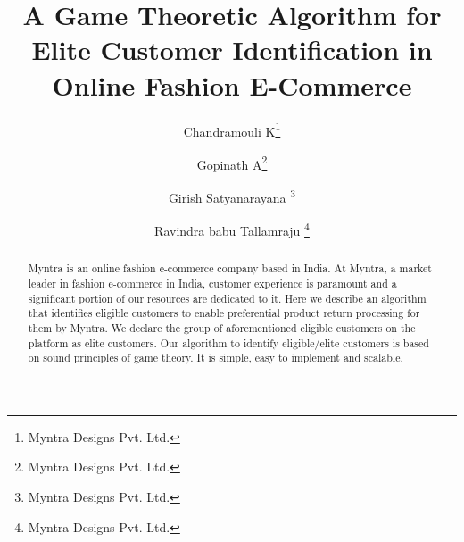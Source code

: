 \documentclass[twoside,leqno,twocolumn]{article}
\begin{document}

\title{\Large A Game Theoretic Algorithm for Elite Customer Identification in Online Fashion E-Commerce
}
\author{
Chandramouli K\thanks{Myntra Designs Pvt. Ltd.}
\and Gopinath A\thanks{Myntra Designs Pvt. Ltd.}
\and Girish Satyanarayana \thanks{Myntra Designs Pvt. Ltd.}
\and Ravindra babu Tallamraju \thanks{Myntra Designs Pvt. Ltd.}
}

\date{}

\maketitle







\begin{abstract} \small\baselineskip=9pt 
Myntra is an online fashion e-commerce company based in India. At Myntra, a market leader in fashion e-commerce in India, customer experience is paramount and a significant portion of our resources are dedicated to it. Here we describe an algorithm that identifies eligible customers to enable preferential product return processing for them by Myntra. We declare the group of aforementioned eligible customers on the platform as elite customers. Our algorithm to identify eligible/elite customers is based on sound principles of game theory. It is simple, easy to implement and scalable.
\end{abstract}
\end{document}
